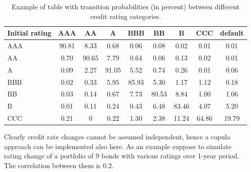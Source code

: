 \begin{table}[htb]
	\centering
	\begin{tabular}{|l|c|c|c|c|c|c|c|c|}
	\hline
	Initial rating & AAA & AA & A & BBB & BB & B & CCC & default \\
	\hline
	\hline
	AAA & 90.81 & 8.33 & 0.68 & 0.06 & 0.08 & 0.02 & 0.01& 0.01 \\ 
	\hline
	AA & 0.70 & 90.65 & 7.79 & 0.64 & 0.06 & 0.13 & 0.02 & 0.01 \\ 
	\hline
	A & 0.09 & 2.27 & 91.05 & 5.52 & 0.74 & 0.26 & 0.01 & 0.06 \\ 
	\hline
	BBB & 0.02 & 0.33 & 5.95 & 85.93 & 5.30 & 1.17 & 1.12 & 0.18 \\
	\hline
	BB & 0.03 & 0.14 & 0.67 & 7.73 & 80.53 & 8.84 & 1.00 & 1.06 \\
	\hline
	B & 0.01 & 0.11 & 0.24 & 0.43 & 6.48 & 83.46 & 4.07 & 5.20 \\
	\hline
	CCC & 0.21 & 0 & 0.22 & 1.30 & 2.38 & 11.24 & 64.86 & 19.79 \\		
	\hline
\end{tabular}
\caption{Example of table with transition probabilities (in percent) between different credit rating categories.}
\label{tab:credit_ratings}
\end{table}

Clearly credit rate changes cannot be assumed independent, hence a copula approach can be implemented also here.
As an example suppose to simulate rating change of a portfolio of 9 bonds with various ratings over 1-year period. The correlation between them is 0.2.

